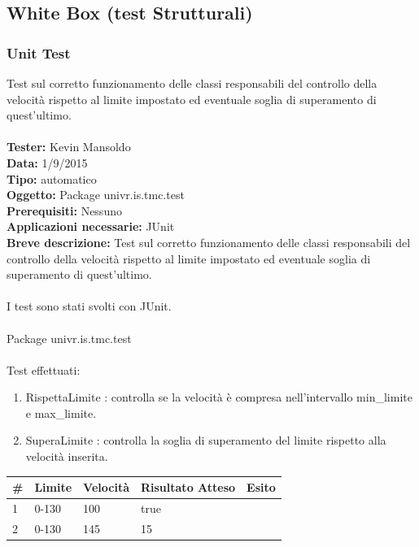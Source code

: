\documentclass[a4paper,12pt]{article}
\begin{document}
\subsection{White Box (test Strutturali)}
\subsubsection{Unit Test}
Test sul corretto funzionamento delle classi responsabili del controllo della velocità rispetto al limite impostato ed eventuale soglia di superamento di quest'ultimo.\\ \\
\textbf{Tester:} Kevin Mansoldo\\
\textbf{Data:} 1/9/2015\\
\textbf{Tipo:} automatico\\
\textbf{Oggetto:} Package univr.is.tmc.test\\
\textbf{Prerequisiti:} Nessuno\\
\textbf{Applicazioni necessarie:} JUnit\\
\textbf{Breve descrizione:} Test sul corretto funzionamento delle classi responsabili del controllo della velocità  rispetto al limite impostato ed eventuale soglia di superamento di quest'ultimo.\\ \\

I test sono stati svolti con JUnit.\\ \\
Package univr.is.tmc.test \\ \\
Test effettuati:
\begin{enumerate}
\item RispettaLimite : controlla se la velocità è compresa nell'intervallo min\_limite e max\_limite.
\item SuperaLimite : controlla la soglia di superamento del limite rispetto alla velocità inserita.
\end{enumerate}



\begin{table}[ht]
\begin{center}
\begin{tabular}{p{1cm} p{3cm} p{3cm} p{3cm} p{2cm}}
\rowcolor{Ash}
\hline
\# & Limite & Velocità & Risultato Atteso & Esito \\ \hline
1 & 0-130 & 100 & true & \cellcolor{green}{OK}\\
2 & 0-130 & 145 & 15 & \cellcolor{green}{OK}\\ \hline
\end{tabular}
\end{center}
\end{table}
\end{document}
